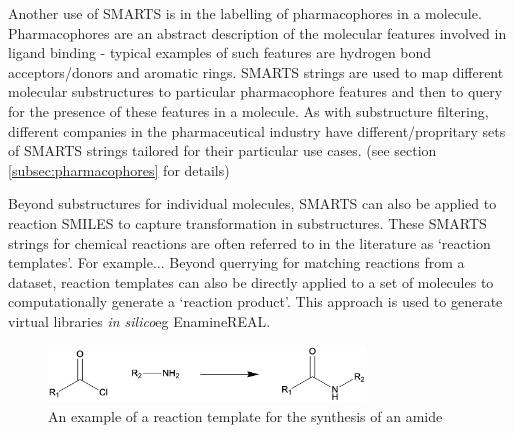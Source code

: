 Another use of SMARTS is in the labelling of pharmacophores in a molecule. Pharmacophores are an abstract description of the molecular features involved in ligand binding - typical examples of such features are hydrogen bond acceptors/donors and aromatic rings. SMARTS strings are used to map different molecular substructures to particular pharmacophore features and then to query for the presence of these features in a molecule. As with substructure filtering, different companies in the pharmaceutical industry have different/propritary sets of SMARTS strings tailored for their particular use cases. (see section \ref{subsec:pharmacophores} for details)

Beyond substructures for individual molecules, SMARTS can also be applied to reaction SMILES to capture transformation in substructures. These SMARTS strings for chemical reactions are often referred to in the literature as `reaction templates'. For example... Beyond querrying for matching reactions from a dataset, reaction templates can also be directly applied to a set of molecules to computationally generate a `reaction product'. This approach is used to generate virtual libraries \textit{in silico}eg EnamineREAL.


\begin{figure}[htbp!] 
    \centering    
    \includegraphics[width=0.75\textwidth]{Chapters/Background/Figs/rx_template.png}
    \caption[Reaction template]{An example of a reaction template for the synthesis of an amide}
    \label{fig:rx_template}
\end{figure}

